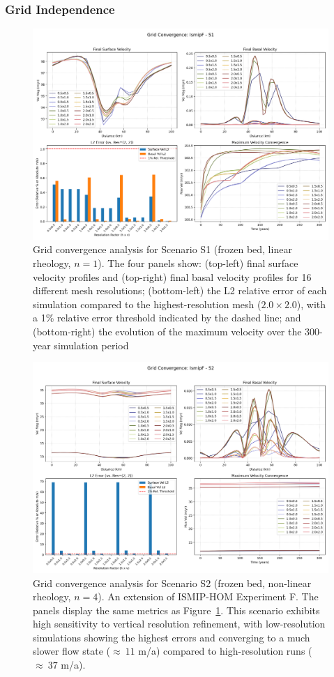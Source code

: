 \subsubsection{Grid Independence}\label{grid_ind}
\begin{figure}[H]
    \includegraphics[scale=0.40]{figures/IsmipF_S1_convergence_summary.png}
    \caption{Grid convergence analysis for Scenario S1 (frozen bed, linear rheology, $n=1$). The four panels show: (top-left) final surface velocity profiles and (top-right) final basal velocity profiles for 16 different mesh resolutions; (bottom-left) the L2 relative error of each simulation compared to the highest-resolution mesh ($2.0\times2.0$), with a 1\% relative error threshold indicated by the dashed line; and (bottom-right) the evolution of the maximum velocity over the 300-year simulation period}
    \label{fig:grid_conv_S1}
\end{figure}
\begin{figure}[H]
    \includegraphics[scale=0.40]{figures/IsmipF_S2_convergence_summary.png}
    \caption{Grid convergence analysis for Scenario S2 (frozen bed, non-linear rheology, $n=4$). An extension of ISMIP-HOM Experiment F. The panels display the same metrics as Figure~\ref{fig:grid_conv_S1}. This scenario exhibits high sensitivity to vertical resolution refinement, with low-resolution simulations showing the highest errors and converging to a much slower flow state ($\approx~11$ m/a) compared to high-resolution runs ($\approx~37$ m/a).}
    \label{fig:grid_conv_S2}
\end{figure}
